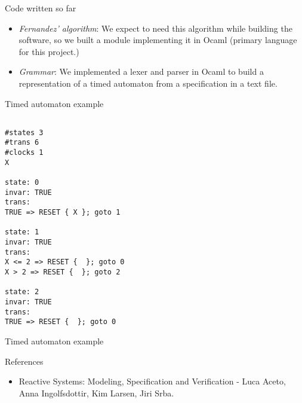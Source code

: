 \documentclass{beamer}
\begin{document}
\begin{frame}{Code written so far}

  \begin{itemize}

    \item \emph{Fernandez' algorithm}: We expect to need this
      algorithm while building the software, so we built a module
      implementing it in Ocaml (primary language for this project.)

    \item \emph{Grammar}: We implemented a lexer and parser in Ocaml
      to build a representation of a timed automaton from a
      specification in a text file.

  \end{itemize}

\end{frame}

\begin{frame}{Timed automaton example}

\begin{verbatim}

#states 3
#trans 6
#clocks 1
X

state: 0
invar: TRUE
trans:
TRUE => RESET { X }; goto 1

state: 1
invar: TRUE
trans:
X <= 2 => RESET {  }; goto 0
X > 2 => RESET {  }; goto 2

state: 2
invar: TRUE
trans:
TRUE => RESET {  }; goto 0

\end{verbatim}

\end{frame}

\begin{frame}{Timed automaton example}

  
\end{frame}

\begin{frame}{References}

\begin{itemize}
\item Reactive Systems: Modeling, Specification and Verification -
  Luca Aceto, Anna Ingolfsdottir, Kim Larsen, Jiri Srba.
\end{itemize}

\end{frame}
\end{document}
